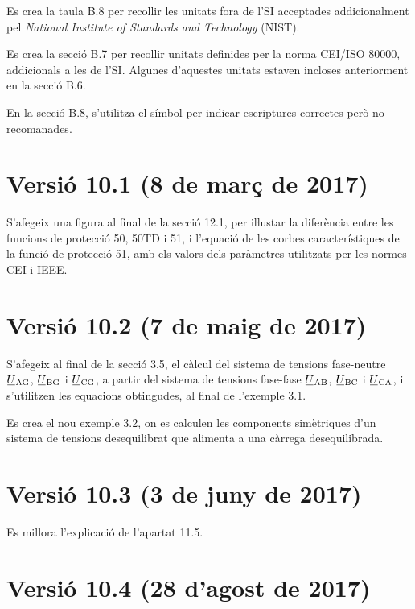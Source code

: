 Es crea la taula B.8 per recollir les unitats fora de l'SI acceptades addicionalment pel \textit{National Institute of Standards and Technology} (NIST).

Es crea la secció B.7 per recollir  unitats definides per la norma  CEI/ISO 80000, addicionals a les de l'SI. Algunes d'aquestes unitats estaven incloses anteriorment en la secció B.6.

En la secció B.8, s'utilitza el símbol \textcolor{Blue}\faQuestionCircle{} per indicar escriptures correctes però no recomanades.

\section*{Versió 10.1 (8 de març de 2017)}

S'afegeix una figura al final de la secció 12.1, per iŀlustar la diferència entre les funcions de protecció 50, 50TD i 51, i l'equació de les corbes característiques de la funció de protecció 51, amb els valors dels paràmetres utilitzats per les normes CEI i IEEE.

\section*{Versió 10.2 (7 de maig de 2017)}

S'afegeix al final de la secció 3.5, el càlcul del sistema de tensions fase-neutre $\cmplx{U}\ped{AG}$, $\cmplx{U}\ped{BG}$ i $\cmplx{U}\ped{CG}$, a partir del sistema de tensions fase-fase $\cmplx{U}\ped{AB}$, $\cmplx{U}\ped{BC}$ i $\cmplx{U}\ped{CA}$, i s'utilitzen les equacions obtingudes, al final de l'exemple 3.1.

Es crea el nou exemple 3.2, on es calculen les components simètriques d'un sistema de tensions desequilibrat que alimenta a una càrrega desequilibrada.

\section*{Versió 10.3 (3 de juny de 2017)}

Es millora l'explicació de l'apartat 11.5.

\section*{Versió 10.4 (28 d'agost de 2017)}

